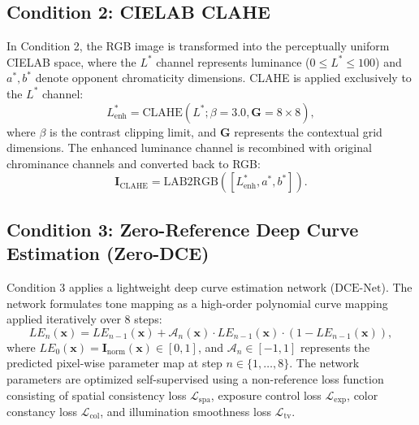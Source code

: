 \documentclass[conference]{IEEEtran}
\begin{document}
\subsection{Condition 2: CIELAB CLAHE}
In Condition 2, the RGB image is transformed into the perceptually uniform CIELAB space, where the $L^*$ channel represents luminance ($0 \le L^* \le 100$) and $a^*, b^*$ denote opponent chromaticity dimensions. CLAHE is applied exclusively to the $L^*$ channel:
\begin{equation}
L^*_{\text{enh}} = \text{CLAHE}\left(L^*; \beta = 3.0, \mathbf{G} = 8 \times 8\right),
\end{equation}
where $\beta$ is the contrast clipping limit, and $\mathbf{G}$ represents the contextual grid dimensions. The enhanced luminance channel is recombined with original chrominance channels and converted back to RGB:
\begin{equation}
\mathbf{I}_{\text{CLAHE}} = \text{LAB2RGB}\left(\left[L^*_{\text{enh}}, a^*, b^*\right]\right).
\end{equation}

\subsection{Condition 3: Zero-Reference Deep Curve Estimation (Zero-DCE)}
Condition 3 applies a lightweight deep curve estimation network ($\text{DCE-Net}$). The network formulates tone mapping as a high-order polynomial curve mapping applied iteratively over 8 steps:
\begin{equation}
LE_n(\mathbf{x}) = LE_{n-1}(\mathbf{x}) + \mathcal{A}_n(\mathbf{x}) \cdot LE_{n-1}(\mathbf{x}) \cdot \left(1 - LE_{n-1}(\mathbf{x})\right),
\label{eq:zerodce}
\end{equation}
where $LE_0(\mathbf{x}) = \mathbf{I}_{\text{norm}}(\mathbf{x}) \in [0, 1]$, and $\mathcal{A}_n \in [-1, 1]$ represents the predicted pixel-wise parameter map at step $n \in \{1, \dots, 8\}$. The network parameters are optimized self-supervised using a non-reference loss function consisting of spatial consistency loss $\mathcal{L}_{\text{spa}}$, exposure control loss $\mathcal{L}_{\text{exp}}$, color constancy loss $\mathcal{L}_{\text{col}}$, and illumination smoothness loss $\mathcal{L}_{\text{tv}}$.
\end{document}

